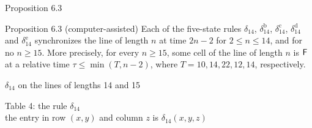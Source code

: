 \begin{frame}{Proposition 6.3}
\vspace{1ex}
\begin{statement}{Proposition 6.3 (computer-assisted)}
Each of the five-state rules $\delta_{14}$, $\delta_{14}^{\mathrm b}$, $\delta_{14}^{\mathrm c}$, $\delta_{14}^{\mathrm d}$ and $\delta_{14}^{\mathrm e}$ synchronizes the line of length $n$ at time $2n-2$ for $2\le n\le14$, and for no $n\ge15$. More precisely, for every $n\ge15$, some cell of the line of length $n$ is $\mathsf F$ at a relative time $\tau\le\min(T,n-2)$, where $T=10,14,22,12,14$, respectively.
\end{statement}
\end{frame}

\begin{frame}{$\delta_{14}$ on the lines of lengths 14 and 15}
\centering{}
\end{frame}

\begin{frame}{Table 4: the rule $\delta_{14}$}
\centering{}\\[1ex]
\small the entry in row $(x,y)$ and column $z$ is $\delta_{14}(x,y,z)$
\end{frame}


